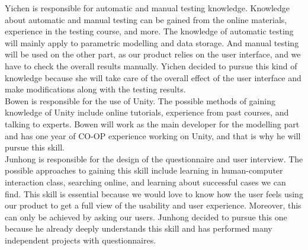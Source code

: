\documentclass[12pt, titlepage]{article}
\begin{document}
Yichen is responsible for automatic and manual testing knowledge. Knowledge about automatic and manual testing can be gained from the online materials, experience in the testing course, and more. The knowledge of automatic testing will mainly apply to parametric modelling and data storage. And manual testing will be used on the other part, as our product relies on the user interface, and we have to check the overall results manually. Yichen decided to pursue this kind of knowledge because she will take care of the overall effect of the user interface and make modifications along with the testing results. \\

Bowen is responsible for the use of Unity. The possible methods of gaining knowledge of Unity include online tutorials, experience from past courses, and talking to experts. Bowen will work as the main developer for the modelling part and has one year of CO-OP experience working on Unity, and that is why he will pursue this skill.\\

Junhong is responsible for the design of the questionnaire and user interview. The possible approaches to gaining this skill include learning in human-computer interaction class, searching online, and learning about successful cases we can find. This skill is essential because we would love to know how the user feels using our product to get a full view of the usability and user experience. Moreover, this can only be achieved by asking our users. Junhong decided to pursue this one because he already deeply understands this skill and has performed many independent projects with questionnaires. 
\end{document}
